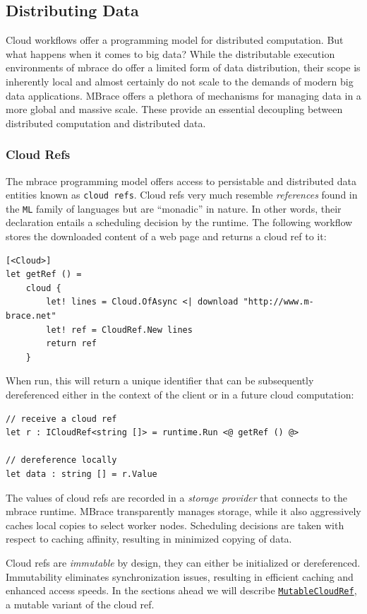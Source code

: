 \documentclass[9pt,a4paper]{article}
\newcommand{\mbrace}{mbrace}
\newcommand{\Mbrace}{MBrace}
\begin{document}
\subsection{Distributing Data}

Cloud workflows offer a programming model for distributed computation.
But what happens when it comes to big data?
While the distributable execution environments of \mbrace{} do offer a
limited form of data distribution, their scope is inherently local
and almost certainly do not scale to the demands of modern big data applications.
\Mbrace{} offers a plethora of mechanisms for managing data in a more global and massive
scale. These provide an essential decoupling between distributed computation and
distributed data.

\subsubsection*{Cloud Refs}

The \mbrace{} programming model offers access to persistable and distributed data entities
known as \texttt{cloud refs}. Cloud refs very much resemble \emph{references} found in the 
\texttt{ML} family of languages but are “monadic” in nature. In other words, their declaration
entails a scheduling decision by the runtime. The following workflow stores the downloaded
content of a web page
and returns a cloud ref to it:
\begin{lstlisting}
[<Cloud>]
let getRef () =
    cloud {
        let! lines = Cloud.OfAsync <| download "http://www.m-brace.net"
        let! ref = CloudRef.New lines
        return ref
    }
\end{lstlisting}
When run, this will return a unique identifier that can be subsequently 
dereferenced either in the context of the client or in a future cloud computation:
\begin{lstlisting}
// receive a cloud ref
let r : ICloudRef<string []> = runtime.Run <@ getRef () @>

// dereference locally
let data : string [] = r.Value
\end{lstlisting}

The values of cloud refs are recorded in a \emph{storage provider} that
connects to the \mbrace{} runtime. \Mbrace{} transparently manages storage,
while it also aggressively caches local copies to select worker nodes.
Scheduling decisions are taken with respect to caching affinity, 
resulting in minimized copying of data.

Cloud refs are \emph{immutable} by design, they can either be initialized or dereferenced.
Immutability eliminates synchronization issues, resulting in efficient caching 
and enhanced access speeds. In the sections ahead we will describe
\hyperref[mutableCloudRef]{\texttt{MutableCloudRef}}, a mutable variant of the cloud ref.
\end{document}
